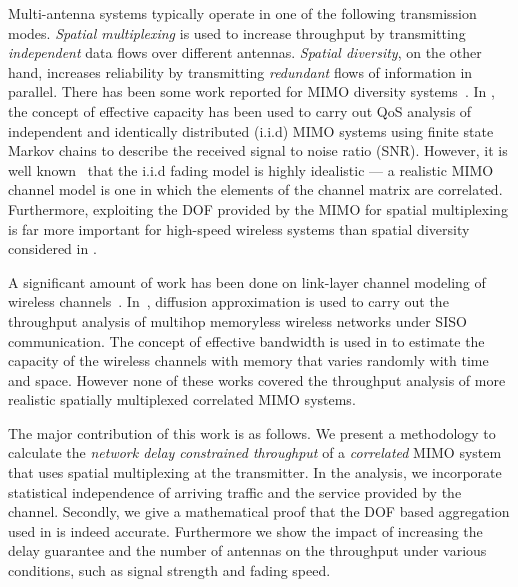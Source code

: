 \documentclass[10pt,conference]{IEEEtran}
\begin{document}
Multi-antenna systems typically operate in one of the following transmission modes.
\emph{Spatial multiplexing} is used to increase throughput by transmitting \emph{independent} data flows over different antennas.
\emph{Spatial diversity}, on the other hand, increases reliability by transmitting \emph{redundant} flows of information in parallel.
There has been some work reported for MIMO diversity systems~\cite{EBWireless:Tang2007:CrossLayerModelingforQoS,MIMO:Diversity:Zorzi99:Lateness}. In \cite{EBWireless:Tang2007:CrossLayerModelingforQoS}, the concept of effective capacity has been used to carry out QoS analysis of independent and identically distributed (i.i.d) MIMO systems using finite state Markov chains to describe the received signal to noise ratio (SNR).
However, it is well known~\cite{MIMO:Correlated:Sayeed02:Deconstructing,MIMO:Veeravalli2005:CorrelatedMIMO:Variance} that the i.i.d fading model is highly idealistic --- a realistic MIMO channel model is one in which the elements of the channel matrix are correlated.  Furthermore, exploiting the DOF provided by the MIMO for spatial multiplexing is far more important for high-speed wireless systems than spatial diversity considered in \cite{EBWireless:Tang2007:CrossLayerModelingforQoS,MIMO:Diversity:Zorzi99:Lateness}.

A significant amount of work has been done on link-layer channel modeling of wireless channels~\cite{WirelessMarkov:Sadeghi08:FiniteStateMarkov:Survey}.
In~\cite{Wireless:queuing:bisnik2009}, diffusion approximation is used to carry out the throughput analysis of multihop memoryless wireless networks under SISO communication.
The concept of effective bandwidth is used in \cite{EBWireless:Li07} to estimate the capacity of the wireless channels with memory that varies randomly with time and space.
However none of these works covered the throughput analysis of more realistic spatially multiplexed correlated MIMO systems.

The major contribution of this work is as follows.
We present a methodology to calculate the \emph{network delay constrained throughput} of a \emph{correlated} MIMO system that uses spatial multiplexing at the transmitter.
In the analysis, we incorporate statistical independence of arriving traffic and the service provided by the channel.
Secondly, we give a mathematical proof that the DOF based aggregation used in \cite{MIMO:QoS:FSM:Kashif} is indeed accurate.
Furthermore we show the impact of increasing the delay guarantee and the number of antennas on the throughput under various conditions, such as signal strength and fading speed.
\end{document}
